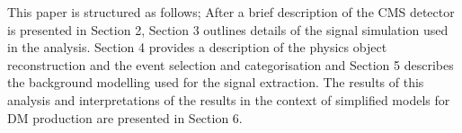 
This paper is structured as follows; After a brief description of the CMS detector is presented in Section 2, Section 3 outlines details of the signal simulation 
used in the analysis. Section 4 provides a description of the physics object reconstruction and the event selection and categorisation and Section 5 describes the 
background modelling used for the signal extraction. The results of this analysis and interpretations of the results in the context of simplified models for DM 
production are presented in Section 6.

